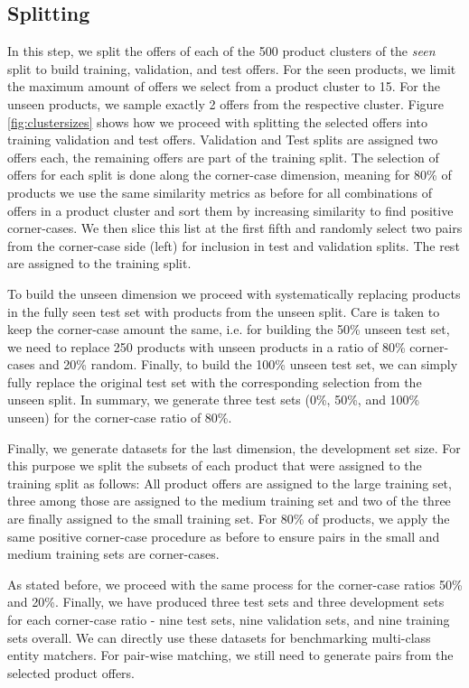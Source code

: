 \documentclass[sigconf,edbt]{acmart-edbt2024}
\begin{document}
\subsection{Splitting}
\label{subsec:splitting}

In this step, we split the offers of each of the 500 product clusters of the \textit{seen} split to build training, validation, and test offers. For the seen products, we limit the maximum amount of offers we select from a product cluster to 15. For the unseen products, we sample exactly 2 offers from the respective cluster. Figure \ref{fig:clustersizes} shows how we proceed with splitting the selected offers into training validation and test offers. 
Validation and Test splits are assigned two offers each, the remaining offers are part of the training split. The selection of offers for each split is done along the corner-case dimension, meaning for 80\% of products we use the same similarity metrics as before for all combinations of offers in a product cluster and sort them by increasing similarity to find positive corner-cases. We then slice this list at the first fifth and randomly select two pairs from the corner-case side (left) for inclusion in test and validation splits. The rest are assigned to the training split.

To build the unseen dimension we proceed with systematically replacing products in the fully seen test set with products from the unseen split. Care is taken to keep the corner-case amount the same, i.e. for building the 50\% unseen test set, we need to replace 250 products with unseen products in a ratio of 80\% corner-cases and 20\% random. Finally, to build the 100\% unseen test set, we can simply fully replace the original test set with the corresponding selection from the unseen split. In summary, we generate three test sets (0\%, 50\%, and 100\% unseen) for the corner-case ratio of 80\%.

Finally, we generate datasets for the last dimension, the development set size. For this purpose we split the subsets of each product that were assigned to the training split as follows: All product offers are assigned to the large training set, three among those are assigned to the medium training set and two of the three are finally assigned to the small training set. For 80\% of products, we apply the same positive corner-case procedure as before to ensure pairs in the small and medium training sets are corner-cases.

As stated before, we proceed with the same process for the corner-case ratios 50\% and 20\%. Finally, we have produced three test sets and three development sets for each corner-case ratio - nine test sets, nine validation sets, and nine training sets overall. We can directly use these datasets for benchmarking multi-class entity matchers. For pair-wise matching, we still need to generate pairs from the selected product offers.
\end{document}
